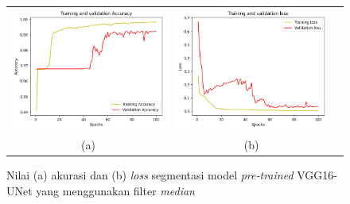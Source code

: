 \begin{enumerate}
	
	\begin{figure}[htbp]
		\centering
		\begin{tabular}{ccc}
			\includegraphics[scale=0.5]{bab4/acc-median-vggunet.png} &
			\includegraphics[scale=0.5]{bab4/loss-median-vggunet.png} & \\
			(a) & (b)    %
		\end{tabular}
		\caption{Nilai (a) akurasi dan (b) \textit{loss} segmentasi model \textit{pre-trained} VGG16-UNet yang menggunakan filter \textit{median}}
		\label{fig:performance-median-vggunet}
	\end{figure}
	

\end{enumerate}
